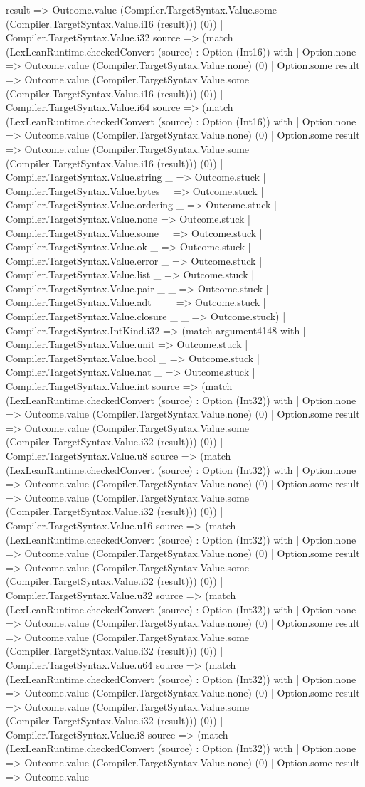 \documentclass[11pt]{article}
\begin{document}
result => Outcome.value (Compiler.TargetSyntax.Value.some (Compiler.TargetSyntax.Value.i16 (result))) (0)) | Compiler.TargetSyntax.Value.i32 source => (match (LexLeanRuntime.checkedConvert (source) : Option (Int16)) with | Option.none => Outcome.value (Compiler.TargetSyntax.Value.none) (0) | Option.some result => Outcome.value (Compiler.TargetSyntax.Value.some (Compiler.TargetSyntax.Value.i16 (result))) (0)) | Compiler.TargetSyntax.Value.i64 source => (match (LexLeanRuntime.checkedConvert (source) : Option (Int16)) with | Option.none => Outcome.value (Compiler.TargetSyntax.Value.none) (0) | Option.some result => Outcome.value (Compiler.TargetSyntax.Value.some (Compiler.TargetSyntax.Value.i16 (result))) (0)) | Compiler.TargetSyntax.Value.string \_ => Outcome.stuck | Compiler.TargetSyntax.Value.bytes \_ => Outcome.stuck | Compiler.TargetSyntax.Value.ordering \_ => Outcome.stuck | Compiler.TargetSyntax.Value.none => Outcome.stuck | Compiler.TargetSyntax.Value.some \_ => Outcome.stuck | Compiler.TargetSyntax.Value.ok \_ => Outcome.stuck | Compiler.TargetSyntax.Value.error \_ => Outcome.stuck | Compiler.TargetSyntax.Value.list \_ => Outcome.stuck | Compiler.TargetSyntax.Value.pair \_ \_ => Outcome.stuck | Compiler.TargetSyntax.Value.adt \_ \_ => Outcome.stuck | Compiler.TargetSyntax.Value.closure \_ \_ => Outcome.stuck) | Compiler.TargetSyntax.IntKind.i32 => (match argument4148 with | Compiler.TargetSyntax.Value.unit => Outcome.stuck | Compiler.TargetSyntax.Value.bool \_ => Outcome.stuck | Compiler.TargetSyntax.Value.nat \_ => Outcome.stuck | Compiler.TargetSyntax.Value.int source => (match (LexLeanRuntime.checkedConvert (source) : Option (Int32)) with | Option.none => Outcome.value (Compiler.TargetSyntax.Value.none) (0) | Option.some result => Outcome.value (Compiler.TargetSyntax.Value.some (Compiler.TargetSyntax.Value.i32 (result))) (0)) | Compiler.TargetSyntax.Value.u8 source => (match (LexLeanRuntime.checkedConvert (source) : Option (Int32)) with | Option.none => Outcome.value (Compiler.TargetSyntax.Value.none) (0) | Option.some result => Outcome.value (Compiler.TargetSyntax.Value.some (Compiler.TargetSyntax.Value.i32 (result))) (0)) | Compiler.TargetSyntax.Value.u16 source => (match (LexLeanRuntime.checkedConvert (source) : Option (Int32)) with | Option.none => Outcome.value (Compiler.TargetSyntax.Value.none) (0) | Option.some result => Outcome.value (Compiler.TargetSyntax.Value.some (Compiler.TargetSyntax.Value.i32 (result))) (0)) | Compiler.TargetSyntax.Value.u32 source => (match (LexLeanRuntime.checkedConvert (source) : Option (Int32)) with | Option.none => Outcome.value (Compiler.TargetSyntax.Value.none) (0) | Option.some result => Outcome.value (Compiler.TargetSyntax.Value.some (Compiler.TargetSyntax.Value.i32 (result))) (0)) | Compiler.TargetSyntax.Value.u64 source => (match (LexLeanRuntime.checkedConvert (source) : Option (Int32)) with | Option.none => Outcome.value (Compiler.TargetSyntax.Value.none) (0) | Option.some result => Outcome.value (Compiler.TargetSyntax.Value.some (Compiler.TargetSyntax.Value.i32 (result))) (0)) | Compiler.TargetSyntax.Value.i8 source => (match (LexLeanRuntime.checkedConvert (source) : Option (Int32)) with | Option.none => Outcome.value (Compiler.TargetSyntax.Value.none) (0) | Option.some result => Outcome.value 
\end{document}
